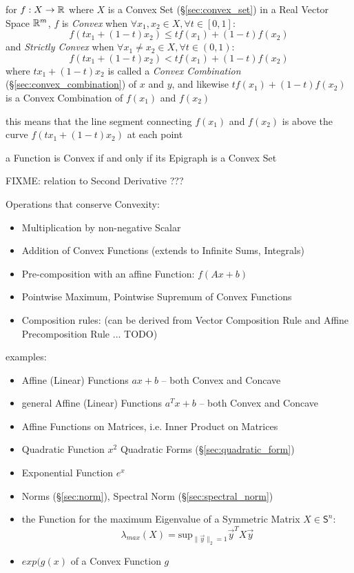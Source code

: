 for $f : X \rightarrow \mathbb{R}$ where $X$ is a Convex Set
(\S\ref{sec:convex_set}) in a Real Vector Space $\mathbb{R}^m$, $f$ is
\emph{Convex} when $\forall x_1, x_2 \in X, \forall t \in [0,1]$:
\[
  f(tx_1 + (1-t)x_2) \leq tf(x_1) + (1-t)f(x_2)
\]
and \emph{Strictly Convex} when $\forall x_1 \neq x_2 \in X, \forall t \in
(0,1)$:
\[
  f(tx_1 + (1-t)x_2) < tf(x_1) + (1-t)f(x_2)
\]
where $tx_1 + (1-t)x_2$ is called a \emph{Convex Combination}
(\S\ref{sec:convex_combination}) of $x$ and $y$, and likewise $tf(x_1) +
(1-t)f(x_2)$ is a Convex Combination of $f(x_1)$ and $f(x_2)$

this means that the line segment connecting $f(x_1)$ and $f(x_2)$ is above the
curve $f(tx_1 + (1-t)x_2)$ at each point

a Function is Convex if and only if its Epigraph is a Convex Set

FIXME: relation to Second Derivative ???

Operations that conserve Convexity:
\begin{itemize}
  \item Multiplication by non-negative Scalar
  \item Addition of Convex Functions (extends to Infinite Sums, Integrals)
  \item Pre-composition with an affine Function: $f(Ax + b)$
  \item Pointwise Maximum, Pointwise Supremum of Convex Functions
  \item Composition rules: (can be derived from Vector Composition Rule and
    Affine Precomposition Rule ... TODO)
\end{itemize}

examples:
\begin{itemize}
  \item Affine (Linear) Functions $ax + b$ -- both Convex and Concave
  \item general Affine (Linear) Functions $a^T x + b$ -- both Convex and Concave
  \item Affine Functions on Matrices, i.e. Inner Product on Matrices
  \item Quadratic Function $x^2$ \fist Quadratic Forms
    (\S\ref{sec:quadratic_form})
  \item Exponential Function $e^x$
  \item Norms (\S\ref{sec:norm}), Spectral Norm (\S\ref{sec:spectral_norm})
  \item the Function for the maximum Eigenvalue of a Symmetric Matrix $X \in
    \mathsf{S}^n$:
    \[
      \lambda_{max}(X) = \mathrm{sup}_{\|\vec{y}\|_2=1} \vec{y}^T X \vec{y}
    \]
  \item $exp (g(x)$ of a Convex Function $g$
\end{itemize}



